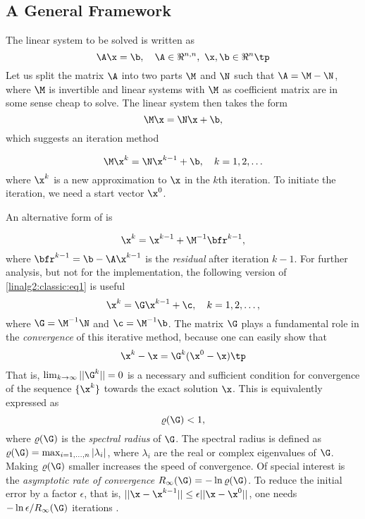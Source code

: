 \subsection{A General Framework}
\label{ch:linalg2:classic:framework}
The linear system to be solved is written as
\[ \A\x = \b,\quad \A\in\Re^{n,n},\ \x,\b\in\Re^n \tp\]
Let us split the matrix $\A$ into two parts $\M$ and $\N$ such that
$\A = \M -\N$, where $\M$ is invertible and linear systems with $\M$
as coefficient matrix are in some sense cheap to solve.
The linear system then takes the form
\[ \M\x = \N\x + \b , \]
which suggests an iteration method

\begin{equation}
\M\x^{k} = \N\x^{k-1} + \b,\quad k=1,2,\ldots
\label{linalg2:classic:eq1}
\end{equation}
where $\x^{k}$ is a new approximation to $\x$ in the $k$th iteration.
To initiate the iteration, we need a start vector $\x^0$.

An alternative form of  is

\begin{equation}
\x^{k} = \x^{k-1} + \M^{-1}\bfr^{k-1},
\label{linalg2:classic:eq2}
\end{equation}
where $\bfr^{k-1} = \b -\A\x^{k-1}$ is the \emph{residual}
after iteration $k-1$.
For further analysis, but not for the implementation, %
the following version of
\eqref{linalg2:classic:eq1} is useful
\[ \x^{k} = \G\x^{k-1} + \c,\quad k=1,2,\ldots,\]
where $\G = \M^{-1}\N$ and $\c = \M^{-1}\b$.
The matrix $\G$ plays a fundamental role in the \emph{convergence} of
this iterative method, because one can easily show that
\[ \x^{k} - \x = \G^{k} (\x^0 - \x )\tp \]
That is, $\lim_{k\rightarrow\infty}||\G^{k}|| =0$ is a necessary and sufficient
condition for convergence of the sequence $\{\x^{k}\}$ towards the
exact solution $\x$. This is equivalently expressed as
\[ \varrho (\G ) < 1,\]
where $\varrho (\G )$ is the \emph{spectral radius} 
of $\G$. The spectral radius is defined as
$\varrho (\G )=\max_{i=1,\ldots,n}|\lambda_i|$,
where $\lambda_i$ are the real or complex eigenvalues of $\G$. Making
$\varrho (\G )$ smaller increases the speed of convergence.
Of special interest is the \emph{asymptotic rate of convergence}
$R_{\infty} (\G) = -\ln\varrho (\G )$.
To reduce the initial error by a factor $\epsilon$, that is,
${ ||\x -\x^{k-1}||}\leq\epsilon  ||\x -\x^0|| $,
one needs $-\ln\epsilon /R_{\infty}(\G )$ iterations \cite{BruBok}.


